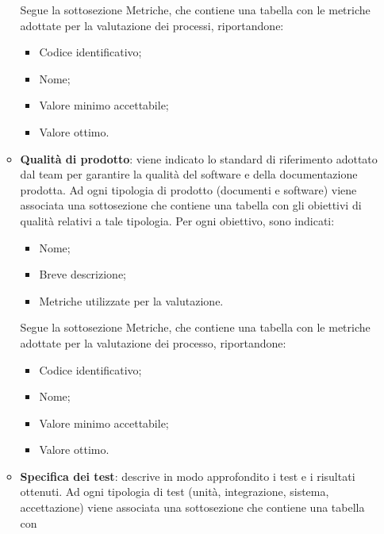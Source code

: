 \begin{itemize}
\begin{itemize}
                        Segue la sottosezione Metriche, che contiene una tabella con le metriche
                        adottate per la valutazione dei processi, riportandone:
                        \begin{itemize}
                              \item Codice identificativo;
                              \item Nome;
                              \item Valore minimo accettabile;
                              \item Valore ottimo.
                        \end{itemize}
                  \item \textbf{Qualità di prodotto}: viene indicato lo standard di riferimento adottato dal team per garantire la qualità del software e della documentazione prodotta.
                        Ad ogni tipologia di prodotto (documenti e software) viene associata una sottosezione che contiene una tabella con
                        gli obiettivi di qualità relativi a tale tipologia. Per ogni obiettivo, sono indicati:
                        \begin{itemize}
                              \item Nome;
                              \item Breve descrizione;
                              \item Metriche utilizzate per la valutazione.
                        \end{itemize}
                        Segue la sottosezione Metriche, che contiene una tabella con le metriche
                        adottate per la valutazione dei processo, riportandone:
                        \begin{itemize}
                              \item Codice identificativo;
                              \item Nome;
                              \item Valore minimo accettabile;
                              \item Valore ottimo.
                        \end{itemize}
                  \item \textbf{Specifica dei test}: descrive in modo approfondito i test e i risultati ottenuti.
                        Ad ogni tipologia di test (unità, integrazione, sistema, accettazione) viene associata una sottosezione che contiene una tabella con

\end{itemize}
\end{itemize}
